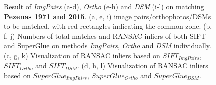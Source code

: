 \begin{figure}[htbp]
\begin{center}
{\begin{minipage}[t]{0.48\linewidth}
            \end{minipage}%
        }
        \caption{{\scriptsize Result of \textit{ImgPairs} (a-d), \textit{Ortho} (e-h) and \textit{DSM} (i-l) on matching \textbf{Pezenas 1971 and 2015}. (a, e, i) image pairs/orthophotos/DSMs to be matched, with red rectangles indicating the common zone. (b, f, j) Numbers of total matches and RANSAC inliers of both SIFT and SuperGlue on methods \textit{ImgPairs}, \textit{Ortho} and \textit{DSM} individually. (c, g, k) Visualization of RANSAC inliers based on $SIFT_{ImgPairs}$, $SIFT_{Ortho}$ and $SIFT_{DSM}$. (d, h, l) Visualization of RANSAC inliers based on $SuperGlue_{ImgPairs}$, $SuperGlue_{Ortho}$ and $SuperGlue_{DSM}$.}}        
        \label{MatchVizPezenas1971DSM}
    \end{center}
\end{figure} 



